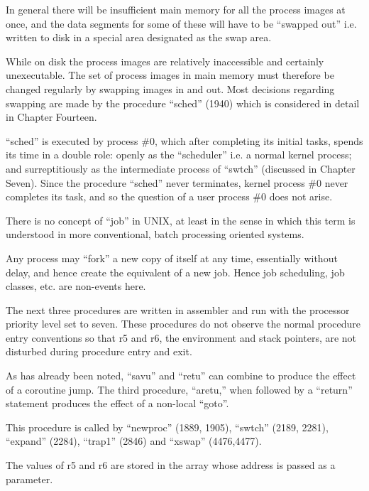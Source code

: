 
In general there will be insufficient
main memory for all the process images
at once, and the data segments for some
of these will have to be ``swapped out''
i.e. written to disk in a special area
designated as the swap area.

While on disk the process images are
relatively inaccessible and certainly
unexecutable. The set of process
images in main memory must therefore be
changed regularly by swapping images in
and out. Most decisions regarding
swapping are made by the procedure
``sched'' (1940) which is considered in
detail in Chapter Fourteen.

``sched'' is executed by process \#0,
which after completing its initial
tasks, spends its time in a double
role: openly as the ``scheduler'' i.e. a
normal kernel process; and surreptitiously as the intermediate process of
``swtch'' (discussed in Chapter Seven).
Since the procedure ``sched'' never terminates,
kernel process \#0 never completes its task, and so the question of
a user process \#0 does not arise.



There is no concept of ``job'' in UNIX,
at least in the sense in which this
term is understood in more conventional, batch processing oriented systems.

Any process may ``fork'' a new copy of
itself at any time, essentially without
delay, and hence create the equivalent
of a new job. Hence job scheduling,
job classes, etc. are non-events here.


The next three procedures are written
in assembler and run with the processor
priority level set to seven. These
procedures do not observe the normal
procedure entry conventions so that r5
and r6, the environment and stack
pointers, are not disturbed during procedure entry and exit.

As has already been noted, ``savu'' and
``retu'' can combine to produce the
effect of a coroutine jump. The third
procedure, ``aretu,'' when followed by a
``return'' statement produces the effect
of a non-local ``goto''.



This procedure is called by ``newproc''
(1889, 1905), ``swtch'' (2189, 2281),
``expand'' (2284), ``trap1'' (2846) and
``xswap'' (4476,4477).

The values of r5 and r6 are stored in
the array whose address is passed as a
parameter.


